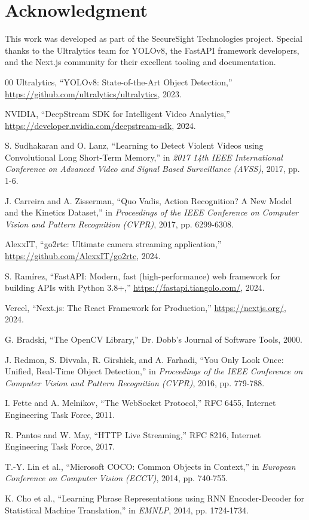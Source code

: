\documentclass[conference]{IEEEtran}
\begin{document}
\section*{Acknowledgment}
This work was developed as part of the SecureSight Technologies project. Special thanks to the Ultralytics team for YOLOv8, the FastAPI framework developers, and the Next.js community for their excellent tooling and documentation.

\begin{thebibliography}{00}
 Ultralytics, ``YOLOv8: State-of-the-Art Object Detection,'' \url{https://github.com/ultralytics/ultralytics}, 2023.

 NVIDIA, ``DeepStream SDK for Intelligent Video Analytics,'' \url{https://developer.nvidia.com/deepstream-sdk}, 2024.

 S. Sudhakaran and O. Lanz, ``Learning to Detect Violent Videos using Convolutional Long Short-Term Memory,'' in \textit{2017 14th IEEE International Conference on Advanced Video and Signal Based Surveillance (AVSS)}, 2017, pp. 1-6.

 J. Carreira and A. Zisserman, ``Quo Vadis, Action Recognition? A New Model and the Kinetics Dataset,'' in \textit{Proceedings of the IEEE Conference on Computer Vision and Pattern Recognition (CVPR)}, 2017, pp. 6299-6308.

 AlexxIT, ``go2rtc: Ultimate camera streaming application,'' \url{https://github.com/AlexxIT/go2rtc}, 2024.

 S. Ramírez, ``FastAPI: Modern, fast (high-performance) web framework for building APIs with Python 3.8+,'' \url{https://fastapi.tiangolo.com/}, 2024.

 Vercel, ``Next.js: The React Framework for Production,'' \url{https://nextjs.org/}, 2024.

 G. Bradski, ``The OpenCV Library,'' Dr. Dobb's Journal of Software Tools, 2000.

 J. Redmon, S. Divvala, R. Girshick, and A. Farhadi, ``You Only Look Once: Unified, Real-Time Object Detection,'' in \textit{Proceedings of the IEEE Conference on Computer Vision and Pattern Recognition (CVPR)}, 2016, pp. 779-788.

 I. Fette and A. Melnikov, ``The WebSocket Protocol,'' RFC 6455, Internet Engineering Task Force, 2011.

 R. Pantos and W. May, ``HTTP Live Streaming,'' RFC 8216, Internet Engineering Task Force, 2017.

 T.-Y. Lin et al., ``Microsoft COCO: Common Objects in Context,'' in \textit{European Conference on Computer Vision (ECCV)}, 2014, pp. 740-755.

 K. Cho et al., ``Learning Phrase Representations using RNN Encoder-Decoder for Statistical Machine Translation,'' in \textit{EMNLP}, 2014, pp. 1724-1734.

\end{thebibliography}
\end{document}
